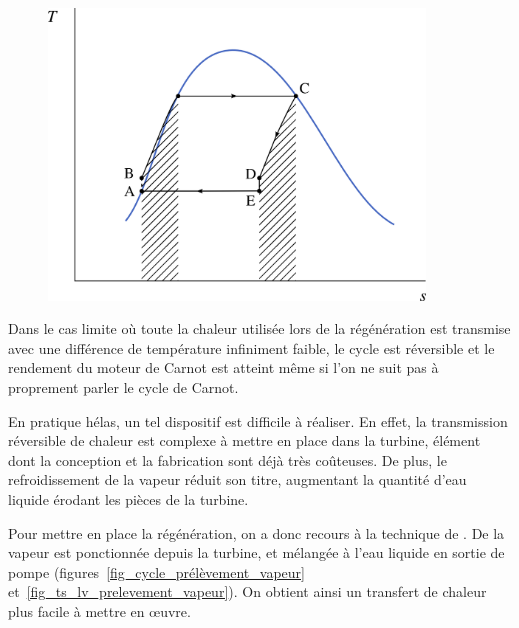 		\begin{figure}
			\begin{center}
				\includegraphics[width=10cm]{images/ts_lv_regeneration.png}
			\end{center}
			\label{fig_ts_lv_regeneration}
		\end{figure}

		Dans le cas limite où toute la chaleur utilisée lors de la régénération est transmise avec une différence de température infiniment faible, le cycle est réversible et le rendement du moteur de Carnot est atteint même si l’on ne suit pas à proprement parler le cycle de Carnot.

		En pratique hélas, un tel dispositif est difficile à réaliser. En effet, la transmission réversible de chaleur est complexe à mettre en place dans la turbine, élément dont la conception et la fabrication sont déjà très coûteuses. De plus, le refroidissement de la vapeur réduit son titre, augmentant la quantité d’eau liquide érodant les pièces de la turbine.

		\clearpage{}
		Pour mettre en place la régénération, on a donc recours à la technique de . De la vapeur est ponctionnée depuis la turbine, et mélangée à l’eau liquide en sortie de pompe (figures~\ref{fig_cycle_prélèvement_vapeur} et~\ref{fig_ts_lv_prelevement_vapeur}). On obtient ainsi un transfert de chaleur plus facile à mettre en œuvre.

